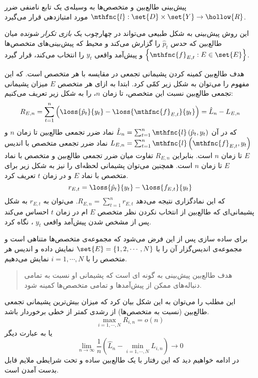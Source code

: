 \documentclass[a4paper,11px]{article}
\begin{document}

پیش‌بینی طالع‌بین و متخصص‌ها به وسیله‌ی یک تابع نامنفی ضرر
$\mthfnc{l} : \set{D} \times \set{Y} \rightarrow \hollow{R}$ 
مورد امتیازدهی قرار می‌گیرد.


این روش پیش‌بینی به شکل طبیعی می‌تواند در چهارچوب یک 
\textit{
بازی تکرار شونده
} 
میان طالع‌بین که حدس 
$\hat{p}_t$ 
را گزارش می‌کند و محیط که پیش‌بینی‌های متخصص‌ها 
$\left\lbrace \mthfnc{f}_{E,t} : E \in \set{E} \right\rbrace$ 
و پیش‌آمد واقعی 
$y_t$ 
را انتخاب می‌کند، قرار گیرد.


هدف طالع‌بین کمینه کردن پشیمانی تجمعی
در مقایسه با هر متخصص است. که این مفهوم را می‌توان به شکل زیر کمّی کرد. ابتدا به ازای هر متخصص 
$E$ 
میزان پشیمانی تجمعی طالع‌بین نسبت این متخصص، تا زمان 
$n$، 
را به شکل زیر تعریف می‌کنیم:
\[
R_{E,n} = \sum^{n}_{t = 1} \left( \loss{\hat{p}_t}{y_t} - \loss{\mthfnc{f}_{E,t}}{y_t} \right) = \hat{L}_n - L_{E,n}
\]
که در آن 
$\hat{L}_n = \sum^{n}_{t=1} \mthfnc{l} \left( \hat{p}_t, y_t \right)$ 
نماد ضرر تجمعی طالع‌بین تا زمان 
$n$ 
و 
$L_{E,n} = \sum^{n}_{t=1} \mthfnc{l} \left( \mthfnc{f}_{E,t}, y_t \right)$ 
نماد ضرر تجمعی متخصص با اندیس 
$E$ 
تا زمان 
$n$ 
است. بنابراین 
$R_{E,n}$ 
تفاوت میان ضرر تجمعی طالع‌بین و متخصص با نماد 
$E$ 
تا زمان 
$n$ 
است. همچنین می‌توان پشیمانی لحظه‌ای را نیز به شکل زیر برای متخصص با نماد 
$E$ 
و در زمان 
$t$ 
تعریف کرد.
\[
r_{E,t} = \loss{ \hat{p}_t }{ y_t } - \loss{ f_{E,t} }{ y_t }
\]
که این نمادگزاری نتیجه می‌دهد 
$R_{E,n} = \sum^{n}_{t=1} r_{E,t}$. 
می‌توان به 
$r_{E,t}$ 
به شکل پشیمانی‌ای که طالع‌بین از انتخاب نکردن نظر متخصص 
$E$
ام در زمان 
$t$ 
احساس می‌کند پس از مشخص شدن پیش‌آمد واقعی 
$y_t$ 
، نگاه کرد.


برای ساده سازی پس از این فرض می‌شود که مجموعه‌ی متخصص‌ها متناهی است و مجموعه‌ی اندیس‌گزار آن را با 
$\set{E} = \left\lbrace 1,2, \cdots, N \right\rbrace$ 
نمایش داده و اندیس هر متخصص را با 
$i = 1, \cdots, N$ 
نمایش می‌دهیم.
\begin{quote}
هدف طالع‌بین پیش‌بینی به گونه ای است که پشیمانی او نسبت به تمامی دنباله‌های ممکن از پیش‌آمدها و تمامی متخصص‌ها کمینه شود.
\end{quote}
این مطلب را می‌توان به این شکل بیان کرد که میزان بیش‌ترین پشیمانی تجمعی طالع‌بین (نسبت به متخصص‌ها) از رشدی کمتر از خطی برخوردار باشد.
\[
\max_{i = 1, \cdots, N} R_{i,n} = o(n)
\]
یا به عبارت دیگر
\[
\lim_{n \rightarrow \infty} \frac{1}{n} \left( \hat{L}_n - \min_{i = 1, \cdots, N} L_{i,n} \right) \rightarrow 0
\]
در ادامه خواهیم دید که این رفتار با یک طالع‌بین ساده و تحت شرایطی ملایم قابل بدست آمدن است.
\end{document}
